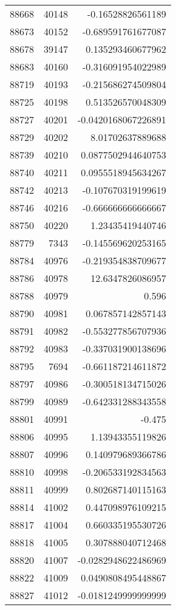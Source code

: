 \begin{tabular}{r | r | r}
88668 & 40148 & -0.16528826561189 \\
88673 & 40152 & -0.689591761677087 \\
88678 & 39147 & 0.135293460677962 \\
88683 & 40160 & -0.316091954022989 \\
88719 & 40193 & -0.215686274509804 \\
88725 & 40198 & 0.513526570048309 \\
88727 & 40201 & -0.0420168067226891 \\
88729 & 40202 & 8.01702637889688 \\
88739 & 40210 & 0.0877502944640753 \\
88740 & 40211 & 0.0955518945634267 \\
88742 & 40213 & -0.107670319199619 \\
88746 & 40216 & -0.666666666666667 \\
88750 & 40220 & 1.23435419440746 \\
88779 & 7343 & -0.145569620253165 \\
88784 & 40976 & -0.219354838709677 \\
88786 & 40978 & 12.6347826086957 \\
88788 & 40979 & 0.596 \\
88790 & 40981 & 0.067857142857143 \\
88791 & 40982 & -0.553277856707936 \\
88792 & 40983 & -0.337031900138696 \\
88795 & 7694 & -0.661187214611872 \\
88797 & 40986 & -0.300518134715026 \\
88799 & 40989 & -0.642331288343558 \\
88801 & 40991 & -0.475 \\
88806 & 40995 & 1.13943355119826 \\
88807 & 40996 & 0.140979689366786 \\
88810 & 40998 & -0.206533192834563 \\
88811 & 40999 & 0.802687140115163 \\
88814 & 41002 & 0.447098976109215 \\
88817 & 41004 & 0.660335195530726 \\
88818 & 41005 & 0.307888040712468 \\
88820 & 41007 & -0.0282948622486969 \\
88822 & 41009 & 0.0490808495448867 \\
88827 & 41012 & -0.0181249999999999 \\

\end{tabular}
